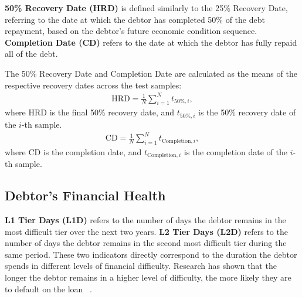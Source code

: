 \textbf{50\% Recovery Date (HRD)} is defined similarly to the 25\% Recovery Date, referring to the date at which the debtor has completed 50\% of the debt repayment, based on the debtor's future economic condition sequence. 
\textbf{Completion Date (CD)} refers to the date at which the debtor has fully repaid all of the debt.

The 50\% Recovery Date and Completion Date are calculated as the means of the respective recovery dates across the test samples:
\begin{equation}
\begin{split}
\text{HRD} = \frac{1}{N} \sum_{i=1}^{N} t_{50\%,i},
\end{split}
\end{equation}
where HRD is the final 50\% recovery date, and $t_{50\%,i}$ is the 50\% recovery date of the $i$-th sample.
\begin{equation}
\begin{split}
\text{CD} = \frac{1}{N} \sum_{i=1}^{N} t_{\text{Completion},i},
\end{split}
\end{equation}
where CD is the completion date, and $t_{\text{Completion},i}$ is the completion date of the $i$-th sample.


\subsection{Debtor’s Financial Health} \label{app:me_hea}

\textbf{L1 Tier Days (L1D)} refers to the number of days the debtor remains in the most difficult tier over the next two years. \textbf{L2 Tier Days (L2D)} refers to the number of days the debtor remains in the second most difficult tier during the same period. These two indicators directly correspond to the duration the debtor spends in different levels of financial difficulty. Research has shown that the longer the debtor remains in a higher level of difficulty, the more likely they are to default on the loan 
~\citep{Tabacchi2016DeterminantsOE}.

